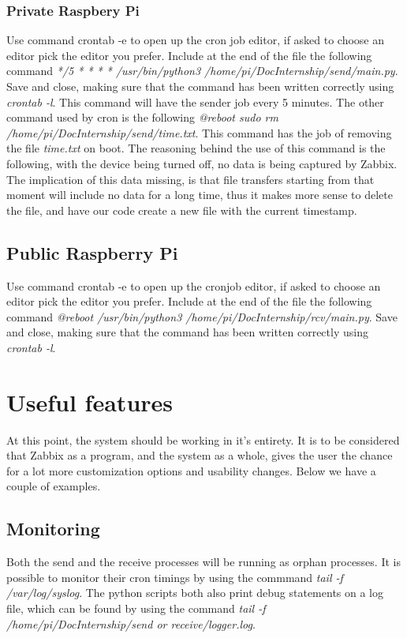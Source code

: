 \documentclass[a4paper,11pt]{scrartcl}
\begin{document}
\subsubsection{Private Raspbery Pi}
Use command crontab -e to open up the cron job editor, if asked to choose an editor pick the editor you prefer. Include at the end of the file the following command \textit{*/5 * * * *  /usr/bin/python3 /home/pi/DocInternship/send/main.py}. Save and close, making sure that the command has been written correctly using \textit{crontab -l}. This command will have the sender job every 5 minutes. The other command used by cron is the following \textit{@reboot  sudo rm /home/pi/DocInternship/send/time.txt}. This command has the job of removing the file \textit{time.txt} on boot. The reasoning behind the use of this command is the following, with the device being turned off, no data is being captured by Zabbix. The implication of this data missing, is that file transfers starting from that moment will include no data for a long time, thus it makes more sense to delete the file, and have our code create a new file with the current timestamp.

\subsection{Public Raspberry Pi}
Use command crontab -e to open up the cronjob editor, if asked to choose an editor pick the editor you prefer. Include at the end of the file the following command \textit{@reboot  /usr/bin/python3 /home/pi/DocInternship/rcv/main.py}. Save and close, making sure that the command has been written correctly using \textit{crontab -l}.

\section{Useful features}
At this point, the system should be working in it's entirety. It is to be considered that Zabbix as a program, and the system as a whole, gives the user the chance for a lot more customization options and usability changes. Below we have a couple of examples.

\subsection{Monitoring}
Both the send and the receive processes will be running as orphan processes. It is possible to monitor their cron timings by using the commmand \textit{tail -f /var/log/syslog}. The python scripts both also print debug statements on a log file, which can be found by using the command \textit{tail -f /home/pi/DocInternship/send or receive/logger.log}. 
\end{document}
